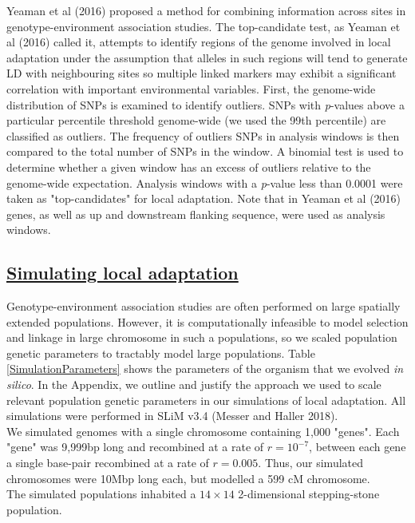 \documentclass[11pt,twoside,lineno]{GSA_format}
\begin{document}
Yeaman et al (2016) proposed a method for combining information across sites in genotype-environment association studies. The top-candidate test, as Yeaman et al (2016)  called it, attempts to identify regions of the genome involved in local adaptation under the assumption that alleles in such regions will tend to generate LD with neighbouring sites so multiple linked markers may exhibit a significant correlation with important environmental variables. First, the genome-wide distribution of SNPs is examined to identify outliers. SNPs with \textit{p}-values above a particular percentile threshold genome-wide (we used the 99th percentile) are classified as outliers. The frequency of outliers SNPs in analysis windows is then compared to the total number of SNPs in the window. A binomial test is used to determine whether a given window has an excess of outliers relative to the genome-wide expectation. Analysis windows with a \textit{p}-value less than 0.0001 were taken as "top-candidates" for local adaptation. Note that in Yeaman et al (2016) genes, as well as up and downstream flanking sequence, were used as analysis windows. 


\subsection{\underline{Simulating local adaptation}} 

Genotype-environment association studies are often performed on large spatially extended populations. However, it is computationally infeasible to model selection and linkage in large chromosome in such a populations, so we scaled population genetic parameters to tractably model large populations. Table \ref{SimulationParameters} shows the parameters of the organism that we evolved \textit{in silico}. In the Appendix, we outline and justify the approach we used to scale relevant population genetic parameters in our simulations of local adaptation. All simulations were performed in SLiM v3.4 (Messer and Haller 2018). \\
 
We simulated genomes with a single chromosome containing 1,000 "genes". Each "gene" was 9,999bp long and recombined at a rate of $r = 10^{-7}$, between each gene a single base-pair recombined at a rate of $r = 0.005$. Thus, our simulated chromosomes were 10Mbp long each, but modelled a 599 cM chromosome. \\

The simulated populations inhabited a $14\times14$ 2-dimensional stepping-stone population.
\end{document}
